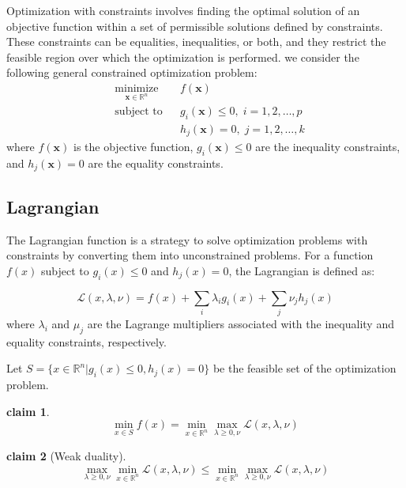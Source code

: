 \documentclass[11pt]{book} %
\newtheorem{claim}{claim}[section]
\begin{document}
Optimization with constraints involves finding the optimal solution of an objective function within a set of permissible solutions defined by constraints. These constraints can be equalities, inequalities, or both, and they restrict the feasible region over which the optimization is performed.
we consider the following general constrained optimization problem:
\begin{equation}
\begin{aligned}
& \underset{\mathbf{x} \in \mathbb{R}^n }{\text{minimize}}
& & f(\mathbf{x}) \\
& \text{subject to}
& & g_i(\mathbf{x}) \leq 0, \; i = 1, 2, \ldots, p \\
&&& h_j(\mathbf{x}) = 0, \; j = 1, 2, \ldots, k
\end{aligned}
\end{equation}
where \(f(\mathbf{x})\) is the objective function, \(g_i(\mathbf{x}) \leq 0\) are the inequality constraints, and \(h_j(\mathbf{x}) = 0\) are the equality constraints.

%
%

\subsection{Lagrangian}

The Lagrangian function is a strategy to solve optimization problems with constraints by converting them into unconstrained problems. For a function \( f(x) \) subject to \( g_i(x) \leq 0 \) and \( h_j(x) = 0 \), the Lagrangian is defined as:

\[
\mathcal{L}(x, \lambda, \nu ) = f(x) + \sum_{i}\lambda_i g_i(x) + \sum_{j}\nu_j h_j(x)
\]
where \( \lambda_i \) and \( \mu_j \) are the Lagrange multipliers associated with the inequality and equality constraints, respectively.

Let $S = \{x \in \mathbb{R}^n | g_i(x) \leq 0, h_j(x) = 0\}$ be the feasible set of the optimization problem. 
\begin{claim}
\[
    \min_{x \in S} f(x) = \min_{x \in \mathbb{R}^n} \max_{\lambda \geq 0, \nu} \mathcal{L}(x, \lambda, \nu)
\]
\end{claim}

\begin{claim}[Weak duality]
\[
    \max_{\lambda \geq 0, \nu} \min_{x \in \mathbb{R}^n} \mathcal{L}(x, \lambda, \nu) \leq \min_{x \in \mathbb{R}^n} \max_{\lambda \geq 0, \nu} \mathcal{L}(x, \lambda, \nu)
\]  
\end{claim}
\end{document}
